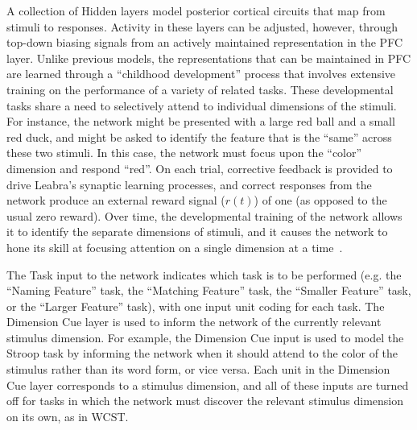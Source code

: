 \documentclass[man]{apa}
\begin{document}
A collection of Hidden layers model posterior cortical circuits that
map from stimuli to responses.  Activity in these layers can be
adjusted, however, through top-down biasing signals from an actively
maintained representation in the PFC layer.  Unlike previous models,
the representations that can be maintained in PFC are learned through
a ``childhood development'' process that involves extensive training
on the performance of a variety of related tasks.  These developmental tasks
share a need to selectively attend to individual dimensions of the
stimuli.  For instance, the network might be presented with a large
red ball and a small red duck, and might be asked to identify the
feature that is the ``same'' across these two stimuli.  In this case,
the network must focus upon the ``color'' dimension and respond
``red''.  On each trial, corrective feedback is provided to drive
Leabra's synaptic learning processes, and correct responses from the
network produce an external reward signal ($r(t)$) of one (as opposed
to the usual zero reward).  Over time, the developmental training of
the network allows it to identify the separate dimensions of stimuli,
and it causes the network to hone its skill at focusing attention on a
single dimension at a time~\cite{RougierNP:2005:XT}.

The Task input to the network indicates which task is to be performed (e.g. the ``Naming Feature'' task, the ``Matching Feature'' task, the ``Smaller Feature'' task, or the ``Larger Feature'' task),
with one input unit coding for each task.  The Dimension Cue layer is
used to inform the network of the currently relevant stimulus
dimension.  For example, the Dimension Cue input is used to model the
Stroop task by informing the network when it should attend to the
color of the stimulus rather than its word form, or vice versa.  Each
unit in the Dimension Cue layer corresponds to a stimulus dimension,
and all of these inputs are turned off for tasks in which the network
must discover the relevant stimulus dimension on its own, as in WCST.
\end{document}
